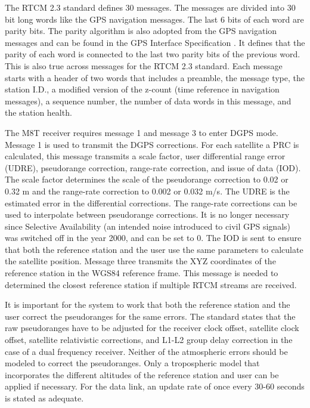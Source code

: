 The RTCM 2.3 standard defines 30 messages.
The messages are divided into 30 bit long words like the GPS navigation messages.
The last 6 bits of each word are parity bits.
The parity algorithm is also adopted from the GPS navigation messages and can be found in the GPS Interface Specification \cite{IS-GPS-200}.
It defines that the parity of each word is connected to the last two parity bits of the previous word.
This is also true across messages for the RTCM 2.3 standard.
Each message starts with a header of two words that includes a preamble, the message type, the station I.D., a modified version of the z-count (time reference in navigation messages), a sequence number, the number of data words in this message, and the station health.

The M8T receiver requires message 1 and message 3 to enter DGPS mode.
Message 1 is used to transmit the DGPS corrections.
For each satellite a PRC is calculated, this message transmits a scale factor, user differential range error (UDRE), pseudorange correction, range-rate correction, and issue of data (IOD).
The scale factor determines the scale of the pseudorange correction to 0.02 or 0.32 m and the range-rate correction to 0.002 or 0.032 m/s.
The UDRE is the estimated error in the differential corrections.
The range-rate corrections can be used to interpolate between pseudorange corrections.
It is no longer necessary since Selective Availability (an intended noise introduced to civil GPS signals) was switched off in the year 2000, and can be set to 0.
The IOD is sent to ensure that both the reference station and the user use the same parameters to calculate the satellite position.
Message three transmits the XYZ coordinates of the reference station in the WGS84 reference frame.
This message is needed to determined the closest reference station if multiple RTCM streams are received.

It is important for the system to work that both the reference station and the user correct the pseudoranges for the same errors.
The standard states that the raw pseudoranges have to be adjusted for the receiver clock offset, satellite clock offset, satellite relativistic corrections, and L1-L2 group delay correction in the case of a dual frequency receiver.
Neither of the atmospheric errors should be modeled to correct the pseudoranges.
Only a tropospheric model that incorporates the different altitudes of the reference station and user can be applied if necessary.
For the data link, an update rate of once every 30-60 seconds is stated as adequate.


